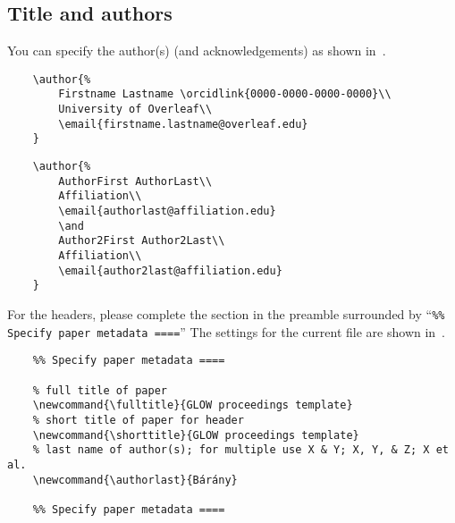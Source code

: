 \subsection{Title and authors}

You can specify the author(s) (and acknowledgements) as shown
in~.

\begin{listing}[ht]
    \begin{verbatim}
    \author{% 
        Firstname Lastname \orcidlink{0000-0000-0000-0000}\\
        University of Overleaf\\
        \email{firstname.lastname@overleaf.edu}
    }
    \end{verbatim}
    \caption{Single author}\label{lst:author-single}
\end{listing}

\begin{listing}[ht]
    \begin{verbatim}
    \author{%
        AuthorFirst AuthorLast\\
        Affiliation\\
        \email{authorlast@affiliation.edu}
        \and
        Author2First Author2Last\\
        Affiliation\\
        \email{author2last@affiliation.edu}
    }
    \end{verbatim}
    \caption{Multiple authors}\label{lst:author-multiple}
\end{listing}

For the headers, please complete the section in the preamble surrounded by 
\enquote{\texttt{\%\% Specify paper metadata ====}} The settings for the
current file are shown in~.

\begin{listing}[ht]
    \begin{verbatim}
    %% Specify paper metadata ====
    
    % full title of paper
    \newcommand{\fulltitle}{GLOW proceedings template}
    % short title of paper for header
    \newcommand{\shorttitle}{GLOW proceedings template}
    % last name of author(s); for multiple use X & Y; X, Y, & Z; X et al.
    \newcommand{\authorlast}{Bárány}
    
    %% Specify paper metadata ====
    \end{verbatim}
    \caption{Specifying title and headers}\label{lst:metadata}
\end{listing}

